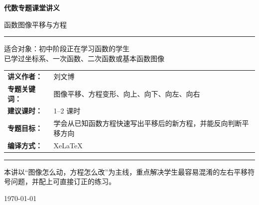 \documentclass[11pt,a4paper,fontset=fandol]{ctexart}
\theoremstyle{formaltheorem}
\theoremstyle{formalexample}
\begin{document}
\thispagestyle{empty}
\begin{titlepage}
\centering
\vspace*{0.9cm}

\begin{tcolorbox}[
  enhanced,
  width=0.92\textwidth,
  colback=white,
  colframe=mainblue,
  boxrule=1pt,
  arc=0mm,
  left=6mm,
  right=6mm,
  top=8mm,
  bottom=8mm
]
\centering

{\fontsize{24}{30}\selectfont\bfseries 代数专题课堂讲义\par}
\vspace{0.7cm}
{\fontsize{17}{22}\selectfont 函数图像平移与方程\par}

\vspace{1.1cm}
\color{rulegray}\rule{0.72\textwidth}{0.7pt}\par
\vspace{1cm}

\begin{tcolorbox}[colback=lightblue,colframe=mainblue,width=0.82\textwidth,boxrule=1pt]
\centering
{\Large 适合对象：初中阶段正在学习函数的学生}\\[0.4em]
{\large 已学过坐标系、一次函数、二次函数或基本函数图像}
\end{tcolorbox}

\vspace{1.2cm}

\renewcommand{\arraystretch}{1.42}
\begin{tabular}{>{\bfseries}p{3.5cm}p{8cm}}
讲义作者： & 刘文博 \\
专题关键词： & 图像平移、方程变形、向上、向下、向左、向右 \\
建议课时： & 1--2 课时 \\
专题目标： & 学会从已知函数方程快速写出平移后的新方程，并能反向判断平移方向 \\
编译方式： & XeLaTeX \\
\end{tabular}

\vspace{1.2cm}
\color{rulegray}\rule{0.72\textwidth}{0.7pt}\par
\vspace{0.8cm}

{\normalsize 本讲以“图像怎么动，方程怎么改”为主线，重点解决学生最容易混淆的左右平移符号问题，并配上可直接订正的练习。\par}

\vspace{0.5cm}
{\large \today\par}
\end{tcolorbox}
\end{titlepage}
\end{document}
